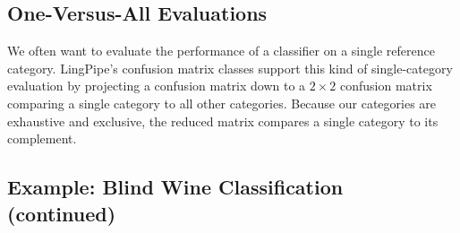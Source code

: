 \subsection{One-Versus-All Evaluations}\label{section:classifier-eval-one-versus-all}

We often want to evaluate the performance of a classifier on a single
reference category.  LingPipe's confusion matrix classes support this
kind of single-category evaluation by projecting a confusion matrix
down to a $2 \times 2$ confusion matrix comparing a single category to
all other categories.  Because our categories are exhaustive and
exclusive, the reduced matrix compares a single category to its
complement.

\subsection{Example: Blind Wine Classification (continued)}

